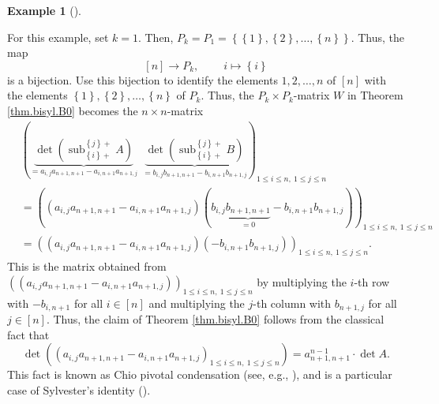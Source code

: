 \documentclass[numbers=enddot,12pt,final,onecolumn,notitlepage]{scrartcl}%
\theoremstyle{definition}
\newtheorem{exam}[theo]{Example}
\newenvironment{example}[1][]
{\begin{exam}[#1]\begin{leftbar}}
{\end{leftbar}\end{exam}}
\begin{document}
\begin{example}
\label{exa.k=1}For this example, set $k=1$. Then, $P_{k}=P_{1}=\left\{
\left\{  1\right\}  ,\left\{  2\right\}  ,\ldots,\left\{  n\right\}  \right\}
$. Thus, the map%
\[
\left[  n\right]  \rightarrow P_{k},\ \ \ \ \ \ \ \ \ \ i\mapsto\left\{
i\right\}
\]
is a bijection. Use this bijection to identify the elements $1,2,\ldots,n$ of
$\left[  n\right]  $ with the elements $\left\{  1\right\}  ,\left\{
2\right\}  ,\ldots,\left\{  n\right\}  $ of $P_{k}$. Thus, the $P_{k}\times
P_{k}$-matrix $W$ in Theorem \ref{thm.bisyl.B0} becomes the $n\times n$-matrix%
\begin{align*}
&  \left(  \underbrace{\det\left(  \operatorname*{sub}\nolimits_{\left\{
i\right\}  +}^{\left\{  j\right\}  +}A\right)  }_{=a_{i,j}a_{n+1,n+1}%
-a_{i,n+1}a_{n+1,j}}\ \ \underbrace{\det\left(  \operatorname*{sub}%
\nolimits_{\left\{  i\right\}  +}^{\left\{  j\right\}  +}B\right)  }%
_{=b_{i,j}b_{n+1,n+1}-b_{i,n+1}b_{n+1,j}}\right)  _{1\leq i\leq n,\ 1\leq
j\leq n}\\
&  =\left(  \left(  a_{i,j}a_{n+1,n+1}-a_{i,n+1}a_{n+1,j}\right)  \left(
b_{i,j}\underbrace{b_{n+1,n+1}}_{=0}-b_{i,n+1}b_{n+1,j}\right)  \right)
_{1\leq i\leq n,\ 1\leq j\leq n}\\
&  =\left(  \left(  a_{i,j}a_{n+1,n+1}-a_{i,n+1}a_{n+1,j}\right)  \left(
-b_{i,n+1}b_{n+1,j}\right)  \right)  _{1\leq i\leq n,\ 1\leq j\leq n}.
\end{align*}
This is the matrix obtained from $\left(  \left(  a_{i,j}a_{n+1,n+1}%
-a_{i,n+1}a_{n+1,j}\right)  \right)  _{1\leq i\leq n,\ 1\leq j\leq n}$ by
multiplying the $i$-th row with $-b_{i,n+1}$ for all $i\in\left[  n\right]  $
and multiplying the $j$-th column with $b_{n+1,j}$ for all $j\in\left[
n\right]  $. Thus, the claim of Theorem \ref{thm.bisyl.B0} follows from the
classical fact that%
\[
\det\left(  \left(  a_{i,j}a_{n+1,n+1}-a_{i,n+1}a_{n+1,j}\right)  _{1\leq
i\leq n,\ 1\leq j\leq n}\right)  =a_{n+1,n+1}^{n-1}\cdot\det A.
\]
This fact is known as Chio pivotal condensation (see, e.g., \cite[Theorem
0.1]{KarZha16}), and is a particular case of Sylvester's identity
(\cite[\S 2.7]{Prasolov}).
\end{example}
\end{document}

